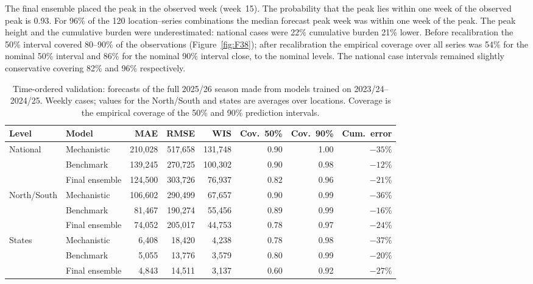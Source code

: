 \documentclass[12pt,a4paper]{article}
\theoremstyle{definition}
\theoremstyle{remark}
\begin{document}
The final ensemble placed the peak in the observed week (week~15). The probability that the peak lies within one week of the observed peak is 0.93. For 96\% of the 120 location--series combinations the median forecast peak week was within one week of the peak. The peak height and the cumulative burden were underestimated: national cases were 22\% cumulative burden 21\% lower. Before recalibration the 50\% interval covered 80--90\% of the observations (Figure~\ref{fig:F38}); after recalibration the empirical coverage over all series was 54\% for the nominal 50\% interval and 86\% for the nominal 90\% interval close, to the nominal levels. The national case intervals remained slightly conservative covering 82\% and 96\% respectively.

\begin{table}[!htbp]
\caption{Time-ordered validation: forecasts of the full 2025/26 season made from models trained on 2023/24--2024/25. Weekly cases; values for the North/South and states are averages over locations. Coverage is the empirical coverage of the 50\% and 90\% prediction intervals.}
\label{tab:validation}
\centering
\small
\setlength{\tabcolsep}{4pt}
\begin{tabular}{llrrrrrr}
\toprule
Level & Model & MAE & RMSE & WIS & Cov.\ 50\% & Cov.\ 90\% & Cum.\ error\\
\midrule
National & Mechanistic & 210{,}028 & 517{,}658 & 131{,}748 & 0.90 & 1.00 & $-35\%$\\
 & Benchmark & 139{,}245 & 270{,}725 & 100{,}302 & 0.90 & 0.98 & $-12\%$\\
 & Final ensemble & 124{,}500 & 303{,}726 & 76{,}937 & 0.82 & 0.96 & $-21\%$\\
North/South & Mechanistic & 106{,}602 & 290{,}499 & 67{,}657 & 0.90 & 0.99 & $-36\%$\\
 & Benchmark & 81{,}467 & 190{,}274 & 55{,}456 & 0.89 & 0.99 & $-16\%$\\
 & Final ensemble & 74{,}052 & 205{,}017 & 44{,}753 & 0.78 & 0.97 & $-24\%$\\
States & Mechanistic & 6{,}408 & 18{,}420 & 4{,}238 & 0.78 & 0.98 & $-37\%$\\
 & Benchmark & 5{,}055 & 13{,}776 & 3{,}579 & 0.80 & 0.99 & $-20\%$\\
 & Final ensemble & 4{,}843 & 14{,}511 & 3{,}137 & 0.60 & 0.92 & $-27\%$\\
\bottomrule
\end{tabular}
\end{table}
\end{document}
